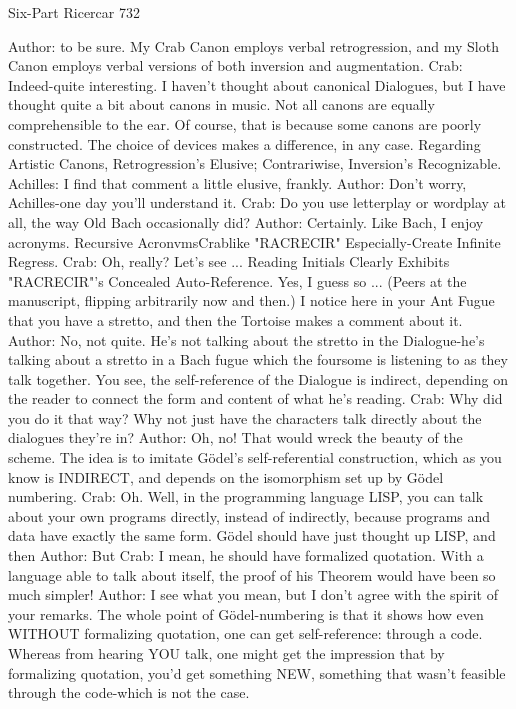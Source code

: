 Six-Part Ricercar                                                                       732

Author: to be sure. My Crab Canon employs verbal retrogression, and my Sloth Canon
  employs verbal versions of both inversion and augmentation.
Crab: Indeed-quite interesting. I haven't thought about canonical Dialogues, but I have
  thought quite a bit about canons in music. Not all canons are equally comprehensible
  to the ear. Of course, that is because some canons are poorly constructed. The choice
  of devices makes a difference, in any case. Regarding Artistic Canons, Retrogression's
  Elusive; Contrariwise, Inversion's Recognizable.
Achilles: I find that comment a little elusive, frankly.
Author: Don't worry, Achilles-one day you'll understand it.
Crab: Do you use letterplay or wordplay at all, the way Old Bach occasionally did?
Author: Certainly. Like Bach, I enjoy acronyms. Recursive AcronvmsCrablike
  "RACRECIR" Especially-Create Infinite Regress.
Crab: Oh, really? Let's see ... Reading Initials Clearly Exhibits "RACRECIR"'s
  Concealed Auto-Reference. Yes, I guess so ... (Peers at the manuscript, flipping
  arbitrarily now and then.) I notice here in your Ant Fugue that you have a stretto, and
  then the Tortoise makes a comment about it.
Author: No, not quite. He's not talking about the stretto in the Dialogue-he's talking about
  a stretto in a Bach fugue which the foursome is listening to as they talk together. You
  see, the self-reference of the Dialogue is indirect, depending on the reader to connect
  the form and content of what he's reading.
Crab: Why did you do it that way? Why not just have the characters talk directly about
  the dialogues they're in?
Author: Oh, no! That would wreck the beauty of the scheme. The idea is to imitate
  Gödel’s self-referential construction, which as you know is INDIRECT, and depends
  on the isomorphism set up by Gödel numbering.
Crab: Oh. Well, in the programming language LISP, you can talk about your own
  programs directly, instead of indirectly, because programs and data have exactly the
  same form. Gödel should have just thought up LISP, and then
Author: But
Crab: I mean, he should have formalized quotation. With a language able to talk about
  itself, the proof of his Theorem would have been so much simpler!
Author: I see what you mean, but I don't agree with the spirit of your remarks. The whole
  point of Gödel-numbering is that it shows how even WITHOUT formalizing
  quotation, one can get self-reference: through a code. Whereas from hearing YOU
  talk, one might get the impression that by formalizing quotation, you'd get something
  NEW, something that wasn't feasible through the code-which is not the case.




